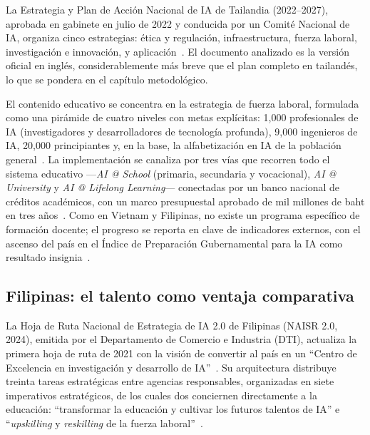 La Estrategia y Plan de Acción Nacional de IA de Tailandia (2022--2027), aprobada en gabinete en julio de 2022 y conducida por un Comité Nacional de IA, organiza cinco estrategias: ética y regulación, infraestructura, fuerza laboral, investigación e innovación, y aplicación~\citep{thailand2022ai}. El documento analizado es la versión oficial en inglés, considerablemente más breve que el plan completo en tailandés, lo que se pondera en el capítulo metodológico.

El contenido educativo se concentra en la estrategia de fuerza laboral, formulada como una pirámide de cuatro niveles con metas explícitas: 1,000 profesionales de IA (investigadores y desarrolladores de tecnología profunda), 9,000 ingenieros de IA, 20,000 principiantes y, en la base, la alfabetización en IA de la población general~\citep{thailand2022ai}. La implementación se canaliza por tres vías que recorren todo el sistema educativo —\textit{AI @ School} (primaria, secundaria y vocacional), \textit{AI @ University} y \textit{AI @ Lifelong Learning}— conectadas por un banco nacional de créditos académicos, con un marco presupuestal aprobado de mil millones de baht en tres años~\citep{thailand2022ai}. Como en Vietnam y Filipinas, no existe un programa específico de formación docente; el progreso se reporta en clave de indicadores externos, con el ascenso del país en el Índice de Preparación Gubernamental para la IA como resultado insignia~\citep{thailand2022ai}.

\subsection{Filipinas: el talento como ventaja comparativa}
\label{subsec:filipinas}

La Hoja de Ruta Nacional de Estrategia de IA 2.0 de Filipinas (NAISR 2.0, 2024), emitida por el Departamento de Comercio e Industria (DTI), actualiza la primera hoja de ruta de 2021 con la visión de convertir al país en un ``Centro de Excelencia en investigación y desarrollo de IA''~\citep{philippines2024naisr}. Su arquitectura distribuye treinta tareas estratégicas entre agencias responsables, organizadas en siete imperativos estratégicos, de los cuales dos conciernen directamente a la educación: ``transformar la educación y cultivar los futuros talentos de IA'' e ``\textit{upskilling} y \textit{reskilling} de la fuerza laboral''~\citep{philippines2024naisr}.

